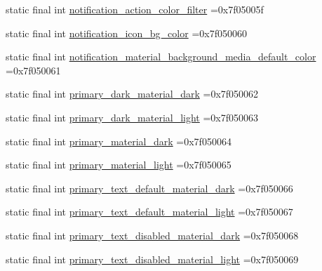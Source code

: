 \begin{DoxyCompactItemize}
\item 
static final int \mbox{\hyperlink{classbr_1_1unb_1_1cic_1_1mp_1_1marketmaster_1_1test_1_1R_1_1color_a51880e1f89a564efc19e0b261003c222}{notification\+\_\+action\+\_\+color\+\_\+filter}} =0x7f05005f
\item 
static final int \mbox{\hyperlink{classbr_1_1unb_1_1cic_1_1mp_1_1marketmaster_1_1test_1_1R_1_1color_a473c7cf5f05a810e2e37238ec54f5d41}{notification\+\_\+icon\+\_\+bg\+\_\+color}} =0x7f050060
\item 
static final int \mbox{\hyperlink{classbr_1_1unb_1_1cic_1_1mp_1_1marketmaster_1_1test_1_1R_1_1color_ad4a9d7c5e2d662a0984a3b8764cc1727}{notification\+\_\+material\+\_\+background\+\_\+media\+\_\+default\+\_\+color}} =0x7f050061
\item 
static final int \mbox{\hyperlink{classbr_1_1unb_1_1cic_1_1mp_1_1marketmaster_1_1test_1_1R_1_1color_af29a302afecf015abadc4b1406bc83f4}{primary\+\_\+dark\+\_\+material\+\_\+dark}} =0x7f050062
\item 
static final int \mbox{\hyperlink{classbr_1_1unb_1_1cic_1_1mp_1_1marketmaster_1_1test_1_1R_1_1color_a70fe169699a89d5cde22dde2fceb18b2}{primary\+\_\+dark\+\_\+material\+\_\+light}} =0x7f050063
\item 
static final int \mbox{\hyperlink{classbr_1_1unb_1_1cic_1_1mp_1_1marketmaster_1_1test_1_1R_1_1color_ace7dc097565cac5e9b9bed7c73ddebcf}{primary\+\_\+material\+\_\+dark}} =0x7f050064
\item 
static final int \mbox{\hyperlink{classbr_1_1unb_1_1cic_1_1mp_1_1marketmaster_1_1test_1_1R_1_1color_a93326118e6e1841f1100fc10f857ca89}{primary\+\_\+material\+\_\+light}} =0x7f050065
\item 
static final int \mbox{\hyperlink{classbr_1_1unb_1_1cic_1_1mp_1_1marketmaster_1_1test_1_1R_1_1color_a2c3f1882cf5f8571475673e267ff4935}{primary\+\_\+text\+\_\+default\+\_\+material\+\_\+dark}} =0x7f050066
\item 
static final int \mbox{\hyperlink{classbr_1_1unb_1_1cic_1_1mp_1_1marketmaster_1_1test_1_1R_1_1color_a11da1178b32eb9f43f042671040ef871}{primary\+\_\+text\+\_\+default\+\_\+material\+\_\+light}} =0x7f050067
\item 
static final int \mbox{\hyperlink{classbr_1_1unb_1_1cic_1_1mp_1_1marketmaster_1_1test_1_1R_1_1color_abd0eb92954cb243d67618c8cda30f79c}{primary\+\_\+text\+\_\+disabled\+\_\+material\+\_\+dark}} =0x7f050068
\item 
static final int \mbox{\hyperlink{classbr_1_1unb_1_1cic_1_1mp_1_1marketmaster_1_1test_1_1R_1_1color_aeb2d7a48cb7b403f6c44ef8429bf3363}{primary\+\_\+text\+\_\+disabled\+\_\+material\+\_\+light}} =0x7f050069

\end{DoxyCompactItemize}
